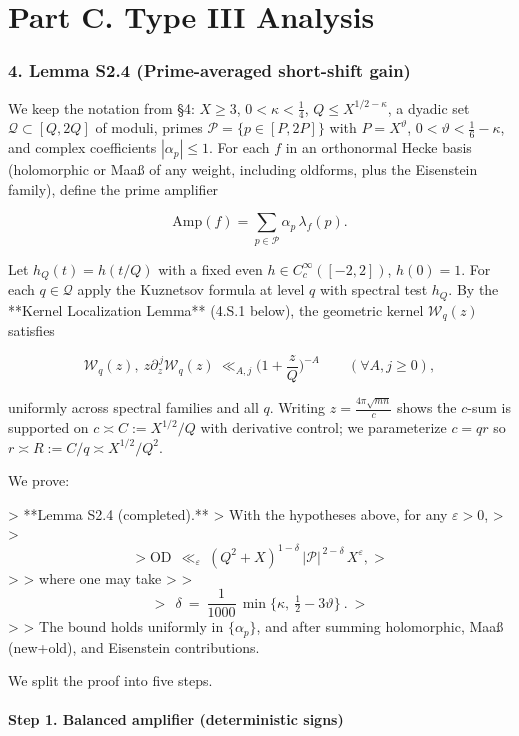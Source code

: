 \documentclass[11pt]{article}
\theoremstyle{definition}
\theoremstyle{remark}
\begin{document}
\part*{Part C. Type III Analysis}

\section*{4. Lemma S2.4 (Prime-averaged short-shift gain)}
We keep the notation from §4: $X\ge 3$, $0<\kappa<\tfrac14$, $Q\le X^{1/2-\kappa}$, a dyadic set $\mathcal Q\subset[Q,2Q]$ of moduli, primes $\mathcal P=\{p\in[P,2P]\}$ with $P=X^\vartheta$, $0<\vartheta<\tfrac16-\kappa$, and complex coefficients $|\alpha_p|\le 1$. For each $f$ in an orthonormal Hecke basis (holomorphic or Maaß of any weight, including oldforms, plus the Eisenstein family), define the prime amplifier

$$
\mathrm{Amp}(f)=\sum_{p\in\mathcal P}\alpha_p\,\lambda_f(p).
$$

Let $h_Q(t)=h(t/Q)$ with a fixed even $h\in C_c^\infty([-2,2])$, $h(0)=1$. For each $q\in\mathcal Q$ apply the Kuznetsov formula at level $q$ with spectral test $h_Q$. By the **Kernel Localization Lemma** (4.S.1 below), the geometric kernel $\mathcal W_q(z)$ satisfies

$$
\mathcal W_q(z),\ z\partial_z^{\,j}\mathcal W_q(z)\ \ll_{A,j}\Big(1+\frac zQ\Big)^{-A}\qquad(\forall A,j\ge0),
$$

uniformly across spectral families and all $q$. Writing $z=\frac{4\pi\sqrt{mn}}{c}$ shows the $c$-sum is supported on $c\asymp C:=X^{1/2}/Q$ with derivative control; we parameterize $c=qr$ so $r\asymp R:=C/q\asymp X^{1/2}/Q^2$.

We prove:

> **Lemma S2.4 (completed).**
> With the hypotheses above, for any $\varepsilon>0$,
>
> $$
> \mathrm{OD}\ \ \ll_{\varepsilon}\ (Q^2+X)^{1-\delta}\,|\mathcal P|^{\,2-\delta}\,X^{\varepsilon},
> $$
>
> where one may take
>
> $$
> \boxed{\ \ \delta\ =\ \frac1{1000}\,\min\!\Big\{\kappa,\ \tfrac12-3\vartheta\Big\}\ .\ }
> $$
>
> The bound holds uniformly in $\{\alpha_p\}$, and after summing holomorphic, Maaß (new+old), and Eisenstein contributions.

We split the proof into five steps.

\subsection*{Step 1. Balanced amplifier (deterministic signs)}
\end{document}

